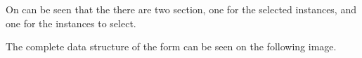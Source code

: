 

On  can be seen that the there are two section, one for the selected instances, and one for the instances to select. 


The complete data structure of the form can be seen on the following image.



